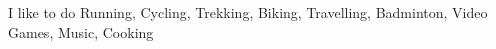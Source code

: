 

\begin{cvskills}
  \cvskill
    {I like to do} %
    {Running, Cycling, Trekking, Biking, Travelling, Badminton, Video Games, Music, Cooking} %

\end{cvskills}
